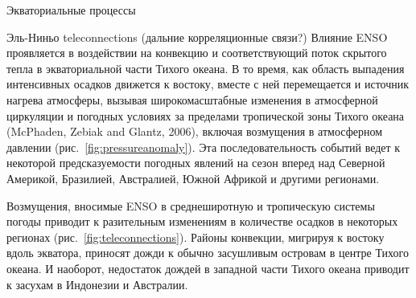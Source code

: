 \begin{chapter}{Экваториальные процессы}
\begin{section}{Эль-Ниньо teleconnections (дальние корреляционные связи?)}
Влияние ENSO
проявляется в воздействии на конвекцию и соответствующий поток скрытого тепла 
в экваториальной части Тихого океана. В то время, как область выпадения 
интенсивных осадков движется к востоку, вместе с ней перемещается и источник
нагрева атмосферы, вызывая широкомасштабные изменения в атмосферной циркуляции
и погодных условиях за пределами тропической зоны Тихого 
океана (McPhaden, Zebiak and Glantz, 2006), включая возмущения в атмосферном
давлении (рис.~\ref{fig:pressureanomaly}). Эта последовательность событий
ведет к некоторой предсказуемости погодных явлений на сезон вперед
над Северной Америкой, Бразилией, Австралией, Южной Африкой и другими 
регионами.
%

Возмущения, вносимые ENSO в среднеширотную и тропическую системы погоды
приводит к разительным изменениям в количестве осадков%
 в некоторых
регионах (рис.~\ref{fig:teleconnections}). Районы конвекции, мигрируя к востоку 
вдоль экватора, приносят дожди к обычно засушливым островам в центре
Тихого океана. И наоборот, недостаток дождей в западной части Тихого океана
приводит к засухам в Индонезии и Австралии.
%


\end{section}
\end{chapter}

